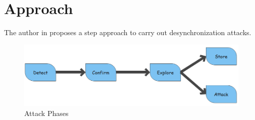 \chapter{Approach}
The author in \cite{b6} proposes a step approach to carry out desynchronization attacks. 
\begin{figure}
	\includegraphics{images/Phases}
	\caption{Attack Phases}
	\label{fig:Phases}
\end{figure}